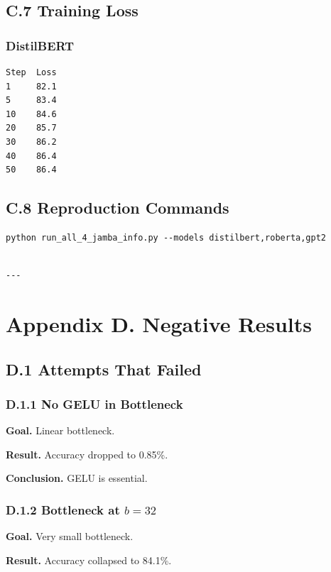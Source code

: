 \subsection{C.7 Training Loss}

\subsubsection{DistilBERT}
\begin{lstlisting}
Step  Loss
1     82.1
5     83.4
10    84.6
20    85.7
30    86.2
40    86.4
50    86.4
\end{lstlisting}

\subsection{C.8 Reproduction Commands}

\begin{lstlisting}
python run_all_4_jamba_info.py --models distilbert,roberta,gpt2
\end{lstlisting}
\begin{lstlisting}

---
\end{lstlisting}

\section{Appendix D. Negative Results}

\subsection{D.1 Attempts That Failed}

\subsubsection{D.1.1 No GELU in Bottleneck}

\textbf{Goal.} Linear bottleneck.

\textbf{Result.} Accuracy dropped to 0.85\%.

\textbf{Conclusion.} GELU is essential.

\subsubsection{D.1.2 Bottleneck at $b = 32$}

\textbf{Goal.} Very small bottleneck.

\textbf{Result.} Accuracy collapsed to 84.1\%.


